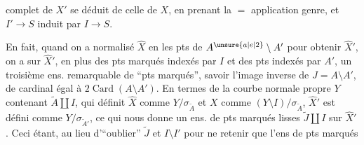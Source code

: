 complet de $X'$ se déduit de celle de $X$, en prenant la $=$ application genre, et $I'\longrightarrow S$ induit par $I\longrightarrow S$.

En fait, quand on a normalisé $\widehat X$ en les pts de $A^{\unsure{a|e|2}}\setminus A'$ pour obtenir $\widehat X'$, on a sur $\widehat X'$, en plus des pts marqués indexés par $I$ et des pts  indexés par $A'$, un troisième ens. remarquable de ``pts marqués'', savoir l'image inverse  de $J=A\setminus A'$,  de cardinal égal à $2\operatorname{Card}(A\setminus A')$. En termes de la courbe normale propre $Y$  contenant $\widetilde A\amalg I$, qui définit $\widehat X$ comme $Y/\sigma_{\widetilde A}$ et $X$ comme $(Y\setminus I)/\sigma_{\widetilde A}$, $\widehat X'$ est défini comme $Y/\sigma_{\widetilde A'}$, ce qui nous donne un ens. de pts marqués lisses  $\widetilde J\amalg I$ sur $\widehat X'$. Ceci étant, au lieu d'``oublier'' $\widetilde J$ et $I\setminus I'$ pour ne retenir que l'ens de pts marqués
